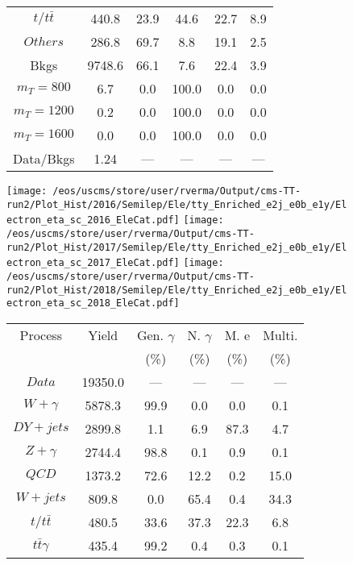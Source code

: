 \begin{figure}
\begin{minipage}[c]{0.32\textwidth}
{\begin{tabular}{cccccc}
$ t/t\bar{t} $ &  440.8 &  23.9 &  44.6 &  22.7 &  8.9\\
$ Others $ &  286.8 &  69.7 &  8.8 &  19.1 &  2.5\\
Bkgs &  9748.6 &  66.1 &  7.6 &  22.4 &  3.9\\
$ m_{T} = 800 $ &  6.7 &  0.0 &  100.0 &  0.0 &  0.0\\
$ m_{T} = 1200 $ &  0.2 &  0.0 &  100.0 &  0.0 &  0.0\\
$ m_{T} = 1600 $ &  0.0 &  0.0 &  100.0 &  0.0 &  0.0\\
Data/Bkgs &  1.24 &  --- &  --- &  --- &  ---\\
\hline
\end{tabular}
}
\end{minipage}
\end{figure}

\begin{figure}
\centering
\texttt{[image: /eos/uscms/store/user/rverma/Output/cms-TT-run2/Plot\_Hist/2016/Semilep/Ele/tty\_Enriched\_e2j\_e0b\_e1y/Electron\_eta\_sc\_2016\_EleCat.pdf]}
\texttt{[image: /eos/uscms/store/user/rverma/Output/cms-TT-run2/Plot\_Hist/2017/Semilep/Ele/tty\_Enriched\_e2j\_e0b\_e1y/Electron\_eta\_sc\_2017\_EleCat.pdf]}
\texttt{[image: /eos/uscms/store/user/rverma/Output/cms-TT-run2/Plot\_Hist/2018/Semilep/Ele/tty\_Enriched\_e2j\_e0b\_e1y/Electron\_eta\_sc\_2018\_EleCat.pdf]}
\begin{minipage}[c]{0.32\textwidth}
\centering
\tiny{
\begin{tabular}{cccccc}
\hline
Process & Yield & Gen. $\gamma$ & N. $\gamma$ & M. e & Multi. \\
 &  & (\%) & (\%) & (\%) & (\%)  \\
\hline
                                                                      $ Data $ &  19350.0 &  --- &  --- &  --- &  ---\\
$ W+\gamma $ &  5878.3 &  99.9 &  0.0 &  0.0 &  0.1\\
$ DY+jets $ &  2899.8 &  1.1 &  6.9 &  87.3 &  4.7\\
$ Z+\gamma $ &  2744.4 &  98.8 &  0.1 &  0.9 &  0.1\\
$ QCD $ &  1373.2 &  72.6 &  12.2 &  0.2 &  15.0\\
$ W+jets $ &  809.8 &  0.0 &  65.4 &  0.4 &  34.3\\
$ t/t\bar{t} $ &  480.5 &  33.6 &  37.3 &  22.3 &  6.8\\
$ t\bar{t}\gamma $ &  435.4 &  99.2 &  0.4 &  0.3 &  0.1\\

\end{tabular}}
\end{minipage}
\end{figure}
